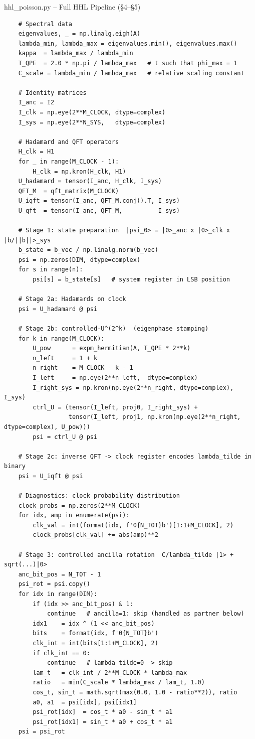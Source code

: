 \documentclass{beamer}
\begin{document}
\begin{frame}{hhl\_poisson.py -- Full HHL Pipeline (\S4--\S5)}
\begin{lstlisting}
    # Spectral data
    eigenvalues, _ = np.linalg.eigh(A)
    lambda_min, lambda_max = eigenvalues.min(), eigenvalues.max()
    kappa  = lambda_max / lambda_min
    T_QPE  = 2.0 * np.pi / lambda_max   # t such that phi_max = 1
    C_scale = lambda_min / lambda_max   # relative scaling constant

    # Identity matrices
    I_anc = I2
    I_clk = np.eye(2**M_CLOCK, dtype=complex)
    I_sys = np.eye(2**N_SYS,   dtype=complex)

    # Hadamard and QFT operators
    H_clk = H1
    for _ in range(M_CLOCK - 1):
        H_clk = np.kron(H_clk, H1)
    U_hadamard = tensor(I_anc, H_clk, I_sys)
    QFT_M  = qft_matrix(M_CLOCK)
    U_iqft = tensor(I_anc, QFT_M.conj().T, I_sys)
    U_qft  = tensor(I_anc, QFT_M,          I_sys)

    # Stage 1: state preparation  |psi_0> = |0>_anc x |0>_clk x |b/||b||>_sys
    b_state = b_vec / np.linalg.norm(b_vec)
    psi = np.zeros(DIM, dtype=complex)
    for s in range(n):
        psi[s] = b_state[s]   # system register in LSB position

    # Stage 2a: Hadamards on clock
    psi = U_hadamard @ psi

    # Stage 2b: controlled-U^(2^k)  (eigenphase stamping)
    for k in range(M_CLOCK):
        U_pow      = expm_hermitian(A, T_QPE * 2**k)
        n_left     = 1 + k
        n_right    = M_CLOCK - k - 1
        I_left     = np.eye(2**n_left,  dtype=complex)
        I_right_sys = np.kron(np.eye(2**n_right, dtype=complex), I_sys)
        ctrl_U = (tensor(I_left, proj0, I_right_sys) +
                  tensor(I_left, proj1, np.kron(np.eye(2**n_right, dtype=complex), U_pow)))
        psi = ctrl_U @ psi

    # Stage 2c: inverse QFT -> clock register encodes lambda_tilde in binary
    psi = U_iqft @ psi

    # Diagnostics: clock probability distribution
    clock_probs = np.zeros(2**M_CLOCK)
    for idx, amp in enumerate(psi):
        clk_val = int(format(idx, f'0{N_TOT}b')[1:1+M_CLOCK], 2)
        clock_probs[clk_val] += abs(amp)**2

    # Stage 3: controlled ancilla rotation  C/lambda_tilde |1> + sqrt(...)|0>
    anc_bit_pos = N_TOT - 1
    psi_rot = psi.copy()
    for idx in range(DIM):
        if (idx >> anc_bit_pos) & 1:
            continue   # ancilla=1: skip (handled as partner below)
        idx1    = idx ^ (1 << anc_bit_pos)
        bits    = format(idx, f'0{N_TOT}b')
        clk_int = int(bits[1:1+M_CLOCK], 2)
        if clk_int == 0:
            continue   # lambda_tilde=0 -> skip
        lam_t   = clk_int / 2**M_CLOCK * lambda_max
        ratio   = min(C_scale * lambda_max / lam_t, 1.0)
        cos_t, sin_t = math.sqrt(max(0.0, 1.0 - ratio**2)), ratio
        a0, a1  = psi[idx], psi[idx1]
        psi_rot[idx]  = cos_t * a0 - sin_t * a1
        psi_rot[idx1] = sin_t * a0 + cos_t * a1
    psi = psi_rot


\end{lstlisting}
\end{frame}
\end{document}
